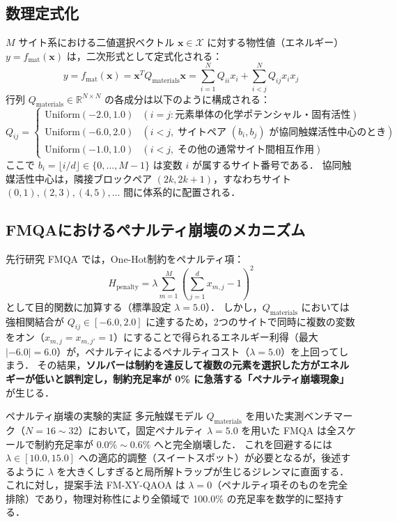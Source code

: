 \documentclass[11pt,a4paper]{ltjsarticle}
\begin{document}
\subsection{数理定式化}
$M$ サイト系における二値選択ベクトル $\bm{x} \in \mathcal{X}$ に対する物性値（エネルギー） $y = f_{\mathrm{mat}}(\bm{x})$ は，二次形式として定式化される：
\begin{equation}
y = f_{\mathrm{mat}}(\bm{x}) = \bm{x}^T Q_{\mathrm{materials}} \bm{x} = \sum_{i=1}^N Q_{ii} x_i + \sum_{i < j}^N Q_{ij} x_i x_j
\end{equation}
行列 $Q_{\mathrm{materials}} \in \mathbb{R}^{N \times N}$ の各成分は以下のように構成される：
\begin{equation}
Q_{ij} = \begin{cases}
\mathrm{Uniform}(-2.0, 1.0) & (i = j: \text{元素単体の化学ポテンシャル・固有活性}) \\
\mathrm{Uniform}(-6.0, 2.0) & (i < j, \; \text{サイトペア } (b_i, b_j) \text{ が協同触媒活性中心のとき}) \\
\mathrm{Uniform}(-1.0, 1.0) & (i < j, \; \text{その他の通常サイト間相互作用})
\end{cases}
\end{equation}
ここで $b_i = \lfloor i / d \rfloor \in \{0, \dots, M-1\}$ は変数 $i$ が属するサイト番号である．
協同触媒活性中心は，隣接ブロックペア $(2k, 2k+1)$，すなわちサイト $(0,1), (2,3), (4,5), \dots$ 間に体系的に配置される．

\subsection{FMQAにおけるペナルティ崩壊のメカニズム}
先行研究 FMQA \cite{kitai2020} では，One-Hot制約をペナルティ項：
\begin{equation}
H_{\mathrm{penalty}} = \lambda \sum_{m=1}^M \left( \sum_{j=1}^d x_{m, j} - 1 \right)^2
\end{equation}
として目的関数に加算する（標準設定 $\lambda = 5.0$）．
しかし，$Q_{\mathrm{materials}}$ においては強相関結合が $Q_{ij} \in [-6.0, 2.0]$ に達するため，2つのサイトで同時に複数の変数をオン（$x_{m, j} = x_{m, j'} = 1$）にすることで得られるエネルギー利得（最大 $|-6.0| = 6.0$）が，ペナルティによるペナルティコスト（$\lambda = 5.0$）を上回ってしまう．
その結果，\textbf{ソルバーは制約を違反して複数の元素を選択した方がエネルギーが低いと誤判定し，制約充足率が 0\% に急落する「ペナルティ崩壊現象」} が生じる．

\begin{alertbox}{ペナルティ崩壊の実験的実証}
多元触媒モデル $Q_{\mathrm{materials}}$ を用いた実測ベンチマーク（$N=16 \sim 32$）において，固定ペナルティ $\lambda=5.0$ を用いた FMQA は全スケールで制約充足率が $0.0\% \sim 0.6\%$ へと完全崩壊した．
これを回避するには $\lambda \in [10.0, 15.0]$ への適応的調整（スイートスポット）が必要となるが，後述するように $\lambda$ を大きくしすぎると局所解トラップが生じるジレンマに直面する．
これに対し，提案手法 FM-XY-QAOA は $\lambda = 0$（ペナルティ項そのものを完全排除）であり，物理対称性により全領域で 100.0\% の充足率を数学的に堅持する．
\end{alertbox}
\end{document}
